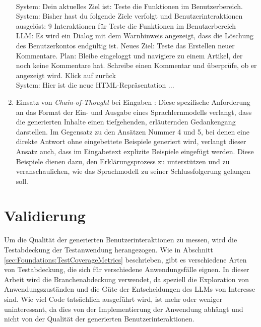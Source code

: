 \begin{enumerate}
{    \\
    System: Dein aktuelles Ziel ist: Teste die Funktionen im Benutzerbereich.
    \\
    System: Bisher hast du folgende Ziele verfolgt und Benutzerinteraktionen ausgelöst: 9 Interaktionen für \glqq{}Teste die Funktionen im Benutzerbereich\grqq{}
    \\
    LLM: Es wird ein Dialog mit dem Warnhinweis angezeigt, dass die Löschung des Benutzerkontos endgültig ist.
    Neues Ziel: Teste das Erstellen neuer Kommentare.
    Plan: Bleibe eingeloggt und navigiere zu einem Artikel, der noch keine Kommentare hat. Schreibe einen Kommentar und überprüfe, ob er angezeigt wird.
    Klick auf \dq zurück\dq
    \\
    System: Hier ist die neue HTML-Repräsentation ...
    }
    \item Einsatz von \textit{Chain-of-Thought} bei Eingaben  \cite{chain-of-thought}:
    Diese spezifische Anforderung an das Format der Ein- und Ausgabe eines Sprachlernmodells verlangt, dass die generierten Inhalte einen tiefgehenden, erläuternden Gedankengang darstellen.
    Im Gegensatz zu den Ansätzen Nummer 4 und 5, bei denen eine direkte Antwort ohne eingebettete Beispiele generiert wird, verlangt dieser Ansatz auch, dass im Eingabetext explizite Beispiele eingefügt werden.
    Diese Beispiele dienen dazu, den Erklärungsprozess zu unterstützen und zu veranschaulichen, wie das Sprachmodell zu seiner Schlussfolgerung gelangen soll.
\end{enumerate}

\section{Validierung}
\label{sec:vaildation}


Um die Qualität der generierten Benutzerinteraktionen zu messen, wird die Testabdeckung der Testanwendung herangezogen.
Wie in Abschnitt \ref{sec:Foundations:TestCoverageMetrics} beschrieben, gibt es verschiedene Arten von Testabdeckung, die sich für verschiedene Anwendungsfälle eignen.
In dieser Arbeit wird die Branchenabdeckung verwendet, da speziell die Exploration von Anwendungszuständen und die Güte der Entscheidungen des LLMs von Interesse sind.
Wie viel Code tatsächlich ausgeführt wird, ist mehr oder weniger uninteressant, da dies von der Implementierung der Anwendung abhängt und nicht von der Qualität der generierten Benutzerinteraktionen.

